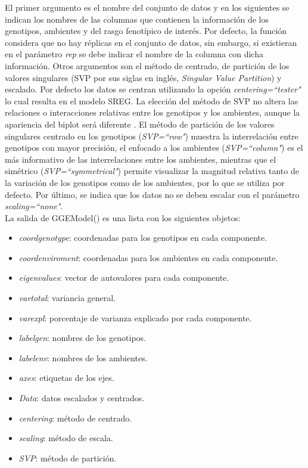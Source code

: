El primer argumento es el nombre del conjunto de datos y en los siguientes se indican los nombres de las columnas que contienen la información de los genotipos, ambientes y del rasgo fenotípico de interés. Por defecto, la función considera que no hay réplicas en el conjunto de datos, sin embargo, si existieran en el parámetro \emph{rep} se debe indicar el nombre de la columna con dicha información. Otros argumentos son el método de centrado, de partición de los valores singulares (SVP por sus siglas en inglés, \emph{Singular Value Partition}) y escalado. Por defecto los datos se centran utilizando la opción \emph{centering=``tester"} lo cual resulta en el modelo SREG. La elección del método de SVP no altera las relaciones o interacciones relativas entre los genotipos y los ambientes, aunque la apariencia del biplot será diferente \citep{Yan2002}. El método de partición de los valores singulares centrado en los genotipos (\emph{SVP=``row"}) muestra la interrelación entre genotipos con mayor precisión, el enfocado a los ambientes (\emph{SVP=``column"}) es el más informativo de las interrelaciones entre los ambientes, mientras que el simétrico (\emph{SVP=``symmetrical"}) permite visualizar la magnitud relativa tanto de la variación de los genotipos como de los ambientes, por lo que se utiliza por defecto. Por último, se indica que los datos no se deben escalar con el parámetro \emph{scaling=``none"}. \\


La salida de \textcolor{fandango}{GGEModel()} es una lista con los siguientes objetos:
\begin{itemize}
\item \emph{coordgenotype}: coordenadas para los genotipos en cada componente.
\item \emph{coordenviroment}: coordenadas para los ambientes en cada componente.
\item \emph{eigenvalues}: vector de autovalores para cada componente.
\item \emph{vartotal}: variancia general.
\item \emph{varexpl}: porcentaje de varianza explicado por cada componente.
\item \emph{labelgen}: nombres de los genotipos.
\item \emph{labelenv}: nombres de los ambientes.
\item \emph{axes}: etiquetas de los ejes.
\item \emph{Data}: datos escalados y centrados.
\item \emph{centering}: método de centrado.
\item \emph{scaling}: método de escala.
\item \emph{SVP}: método de partición. 
\end{itemize}


